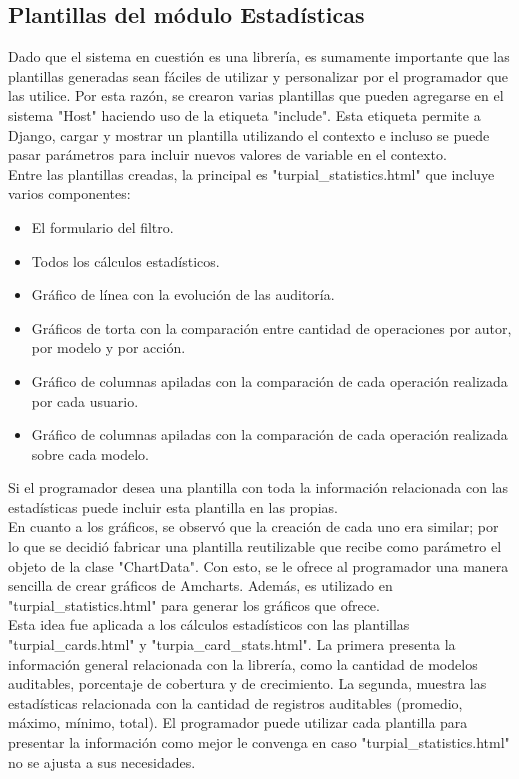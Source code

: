 \subsection{Plantillas del módulo Estadísticas}

Dado que el sistema en cuestión es una librería, es sumamente importante que las plantillas generadas sean fáciles de utilizar y personalizar por el programador que las utilice. Por esta razón, se crearon varias plantillas que pueden agregarse en el sistema "Host" haciendo uso de la etiqueta  "include". Esta etiqueta permite a Django, cargar y mostrar un plantilla utilizando el contexto e incluso se puede pasar parámetros para incluir nuevos valores de variable en el contexto.\\

Entre las plantillas creadas, la principal es "turpial\_statistics.html" que incluye varios componentes:

\begin{itemize}
    \item El formulario del filtro.
    \item Todos los cálculos estadísticos.
    \item Gráfico de línea con la evolución de las auditoría.
    \item Gráficos de torta con la comparación entre cantidad de operaciones por autor, por modelo y por acción.
    \item Gráfico de columnas apiladas con la comparación de cada operación realizada por cada usuario.
    \item Gráfico de columnas apiladas con la comparación de cada operación realizada sobre cada modelo.
\end{itemize}

Si el programador desea una plantilla con toda la información relacionada con las estadísticas puede incluir esta plantilla en las propias.\\

En cuanto a los gráficos, se observó que la creación de cada uno era similar; por lo que se decidió fabricar una plantilla reutilizable que recibe como parámetro el objeto de la clase "ChartData". Con esto, se le ofrece al programador una manera sencilla de crear gráficos de Amcharts. Además, es utilizado en "turpial\_statistics.html" para generar los gráficos que ofrece. \\

Esta idea fue aplicada a los cálculos estadísticos con las plantillas "turpial\_cards.html" y "turpia\_card\_stats.html". La primera presenta la información general relacionada con la librería, como la cantidad de modelos auditables, porcentaje de cobertura y de crecimiento. La segunda, muestra las estadísticas relacionada con la cantidad de registros auditables (promedio, máximo, mínimo, total). El programador puede utilizar cada plantilla para presentar la información como mejor le convenga en caso "turpial\_statistics.html" no se ajusta a sus necesidades.\\

